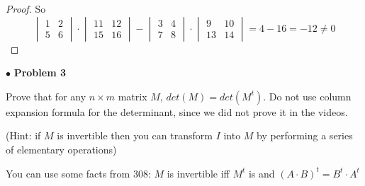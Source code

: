 \documentclass{article}
\begin{document}
\begin{proof}
So
$$\begin{vmatrix} 1&2\\5&6\end{vmatrix} \cdot \begin{vmatrix} 11&12 \\ 15&16 \end{vmatrix} - \begin{vmatrix} 3 & 4 \\ 7&8 \end{vmatrix} \cdot \begin{vmatrix} 9&10 \\ 13&14\end{vmatrix} = 4-16 = -12 \ne 0
$$
\end{proof}
\newpage

$ \bullet$ \textbf{Problem 3}
\medskip

\begin{itshape}
Prove that for any $n \times m$ matrix $M$, $det(M) = det(M^t)$. Do not use column expansion formula for the determinant, since we did not prove it in the videos.
\smallskip

(Hint: if $M$ is invertible then you can transform $I$ into $M$ by performing a series of elementary operations)
\smallskip

You can use some facts from 308: $M$ is invertible iff $M^t$ is and $(A \cdot B)^t = B^t \cdot A^t$
\end{itshape}
\medskip
\end{document}
